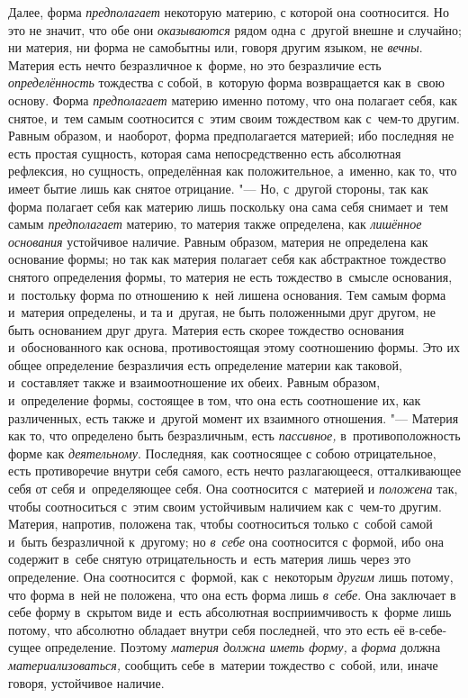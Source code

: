 Далее, форма {\em предполагает} некоторую материю, с
которой она соотносится. Но это не значит, что обе они
{\em оказываются} рядом одна с~другой внешне и
случайно; ни материя, ни форма не самобытны или, говоря другим языком, не
{\em вечны}. Материя есть нечто безразличное к~форме,
но это безразличие есть {\em определённость} тождества
с собой, в~которую форма возвращается как в~свою основу. Форма
{\em предполагает} материю именно потому, что она
полагает себя, как снятое, и~тем самым соотносится с~этим своим тождеством
как с~чем-то другим. Равным образом, и~наоборот, форма предполагается
материей; ибо последняя не есть простая сущность, которая сама
непосредственно есть абсолютная рефлексия, но сущность, определённая как
положительное, а~именно, как то, что имеет бытие лишь как снятое отрицание.
"--- Но, с~другой стороны, так как форма полагает себя как материю лишь
поскольку она сама себя снимает и~тем самым
{\em предполагает} материю, то материя также
определена, как {\em лишённое основания} устойчивое
наличие. Равным образом, материя не определена как основание формы; но так
как материя полагает себя как абстрактное тождество снятого определения
формы, то материя не есть тождество в~смысле основания, и~постольку форма
по отношению к~ней лишена основания. Тем самым форма и~материя определены,
и та и~другая, не быть положенными друг другом, не быть основанием друг
друга. Материя есть скорее тождество основания и~обоснованного как основа,
противостоящая этому соотношению формы. Это их общее определение
безразличия есть определение материи как таковой, и~составляет также и
взаимоотношение их обеих. Равным образом, и~определение формы, состоящее в
том, что она есть соотношение их, как различенных, есть также и~другой
момент их взаимного отношения. "--- Материя как то, что определено быть
безразличным, есть {\em пассивное,} в~противоположность
форме как {\em деятельному}. Последняя, как соотносящее
с собою отрицательное, есть противоречие внутри себя самого, есть нечто
разлагающееся, отталкивающее себя от себя и~определяющее себя. Она
соотносится с~материей и {\em положена} так, чтобы
соотноситься с~этим своим устойчивым наличием как с~чем-то другим. Материя,
напротив, положена так, чтобы соотноситься только с~собой самой и~быть
безразличной к~другому; но {\em в~себе} она соотносится
с формой, ибо она содержит в~себе снятую отрицательность и~есть материя
лишь через это определение. Она соотносится с~формой, как с~некоторым
{\em другим} лишь потому, что форма в~ней не положена,
что она есть форма лишь {\em в~себе}. Она заключает в
себе форму в~скрытом виде и~есть абсолютная восприимчивость к~форме лишь
потому, что абсолютно обладает внутри себя последней, что это есть её
в-себе-сущее определение. Поэтому {\em материя должна
иметь форму,} а {\em форма} должна
{\em материализоваться,} сообщить себе в~материи
тождество с~собой, или, иначе говоря, устойчивое наличие.

